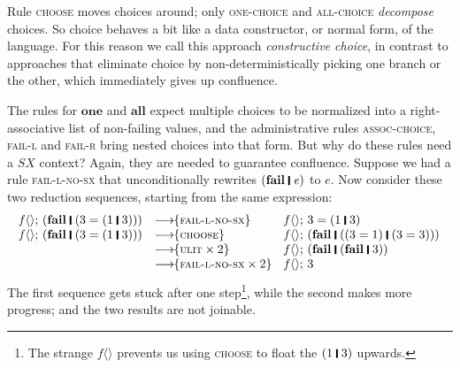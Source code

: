\documentclass[acmsmall,review,dvipsnames]{acmart}
\newcommand{\Conid}[1]{\mathit{#1}}
\newcommand{\Varid}[1]{\mathit{#1}}
\newcommand{\rulename}[1]{\textsc{\small #1}}
\newcommand{\movesto}{\longrightarrow}
\newcommand{\movestoC}[1]{\movesto\!\!\{#1\}}
\newcommand{\movestoR}[1]{\movestoC{\rulename{#1}}}
\newcommand{\movestoRn}[2]{\movestoC{\rulename{#1} \times #2}}
\begin{document}
Rule \rulename{choose} moves choices around; only \rulename{one-choice} and \rulename{all-choice}
\emph{decompose} choices.
So choice behaves a bit like a data constructor, or normal form, of the language.
For this reason we call
this approach \emph{constructive choice}, in contrast to approaches that eliminate choice by non-deterministically
picking one branch or the other, which immediately gives up confluence.

The rules for \ensuremath{\textbf{one}} and \ensuremath{\textbf{all}} expect multiple choices to be
normalized into a right-associative list of non-failing values, and
the administrative rules \rulename{assoc-choice}, \rulename{fail-l}
and \rulename{fail-r} bring nested choices into that form. But why do these rules
need a \ensuremath{\Conid{SX}} context? Again, they are needed to guarantee confluence. Suppose we had a rule \rulename{fail-l-no-sx}
that unconditionally rewrites \ensuremath{(\textbf{fail}\;\rule[-0.3mm]{0.5mm}{2.5mm}\;\Varid{e})} to \ensuremath{\Varid{e}}. Now consider these
two reduction sequences, starting from the same expression:
$$
\begin{array}{rll}
\ensuremath{\Varid{f}\langle\rangle;\,(\textbf{fail}\;\rule[-0.3mm]{0.5mm}{2.5mm}\;(\mathrm{3}\mathrel{=}(\mathrm{1}\;\rule[-0.3mm]{0.5mm}{2.5mm}\;\mathrm{3})))} & \movestoR{fail-l-no-sx} & \ensuremath{\Varid{f}\langle\rangle;\,\mathrm{3}\mathrel{=}(\mathrm{1}\;\rule[-0.3mm]{0.5mm}{2.5mm}\;\mathrm{3})} \\
\ensuremath{\Varid{f}\langle\rangle;\,(\textbf{fail}\;\rule[-0.3mm]{0.5mm}{2.5mm}\;(\mathrm{3}\mathrel{=}(\mathrm{1}\;\rule[-0.3mm]{0.5mm}{2.5mm}\;\mathrm{3})))} & \movestoR{choose} & \ensuremath{\Varid{f}\langle\rangle;\,(\textbf{fail}\;\rule[-0.3mm]{0.5mm}{2.5mm}\;((\mathrm{3}\mathrel{=}\mathrm{1})\;\rule[-0.3mm]{0.5mm}{2.5mm}\;(\mathrm{3}\mathrel{=}\mathrm{3})))} \\
 & \movestoRn{ulit}{2}  & \ensuremath{\Varid{f}\langle\rangle;\,(\textbf{fail}\;\rule[-0.3mm]{0.5mm}{2.5mm}\;(\textbf{fail}\;\rule[-0.3mm]{0.5mm}{2.5mm}\;\mathrm{3}))} \\
 & \movestoRn{fail-l-no-sx}{2} & \ensuremath{\Varid{f}\langle\rangle;\,\mathrm{3}}
\end{array}
$$
The first sequence gets stuck after one step\footnote{The strange \ensuremath{\Varid{f}\langle\rangle} prevents
  us using \rulename{choose} to float the \ensuremath{(\mathrm{1}\;\rule[-0.3mm]{0.5mm}{2.5mm}\;\mathrm{3})} upwards.}, while the second makes more progress;
and the two results are not joinable.
\end{document}

